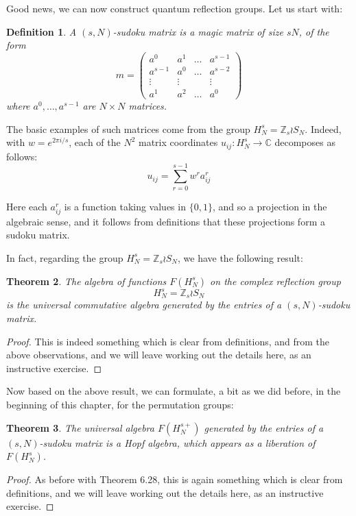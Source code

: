 \documentclass[12pt]{amsbook}
\newtheorem{theorem}{Theorem}[chapter]
\newtheorem{definition}[theorem]{Definition}
\begin{document}
Good news, we can now construct quantum reflection groups. Let us start with:

\begin{definition}
A $(s,N)$-sudoku matrix is a magic matrix of size $sN$, of the form
$$m=\begin{pmatrix}
a^0&a^1&\ldots&a^{s-1}\\
a^{s-1}&a^0&\ldots&a^{s-2}\\
\vdots&\vdots&&\vdots\\
a^1&a^2&\ldots&a^0
\end{pmatrix}$$
where $a^0,\ldots,a^{s-1}$ are $N\times N$ matrices.
\end{definition}

The basic examples of such matrices come from the group $H_N^s=\mathbb Z_s\wr S_N$. Indeed, with $w=e^{2\pi i/s}$, each of the $N^2$ matrix coordinates $u_{ij}:H_N^s\to\mathbb C$ decomposes as follows:
$$u_{ij}=\sum_{r=0}^{s-1}w^ra^r_{ij}$$

Here each $a^r_{ij}$ is a function taking values in $\{0,1\}$, and so a projection in the algebraic sense, and it follows from definitions that these projections form a sudoku matrix. 

\bigskip

In fact, regarding the group $H_N^s=\mathbb Z_s\wr S_N$, we have the following result:

\begin{theorem}
The algebra of functions $F(H_N^s)$ on the complex reflection group
$$H_N^s=\mathbb Z_s\wr S_N$$
is the universal commutative algebra generated by the entries of a $(s,N)$-sudoku matrix.
\end{theorem}

\begin{proof}
This is indeed something which is clear from definitions, and from the above observations, and we will leave working out the details here, as an instructive exercise.
\end{proof}

Now based on the above result, we can formulate, a bit as we did before, in the beginning of this chapter, for the permutation groups:

\begin{theorem}
The universal algebra $F(H_N^{s+})$ generated by the entries of a $(s,N)$-sudoku matrix is a Hopf algebra, which appears as a liberation of $F(H_N^s)$.
\end{theorem}

\begin{proof}
As before with Theorem 6.28, this is again something which is clear from definitions, and we will leave working out the details here, as an instructive exercise.
\end{proof}
\end{document}
